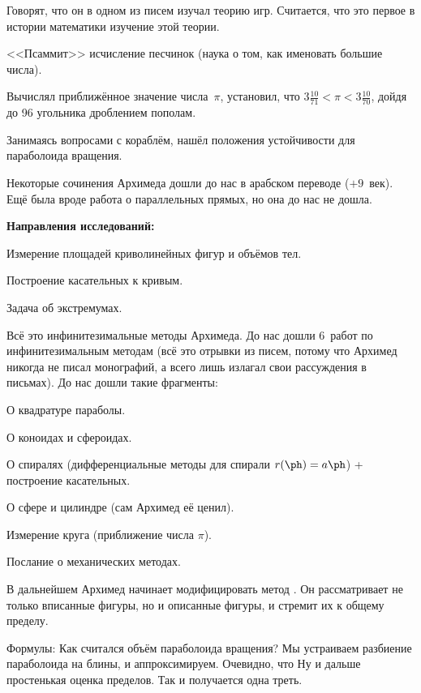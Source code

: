 \documentclass[a4paper,oneside,fleqn,10pt]{article}
\begin{document}
Говорят, что он в одном из писем изучал теорию игр. Считается, что это
первое в истории математики изучение этой теории.

<<Псаммит>> исчисление песчинок (наука о том, как именовать большие
числа).

Вычислял приближённое значение числа~$\pi$, установил, что
$3\frac{10}{71} < \pi < 3\frac{10}{70}$, дойдя до 96 угольника
дроблением пополам.

Занимаясь вопросами с кораблём, нашёл положения устойчивости для
параболоида вращения.

Некоторые сочинения Архимеда дошли до нас в арабском переводе
 ($+9$~век).  Ещё была вроде
работа о параллельных прямых, но она до нас не дошла.

\textbf{Направления исследований:}

\begin{items}{-2}
\item Измерение площадей криволинейных фигур и объёмов тел.
\item Построение касательных к кривым.
\item Задача об экстремумах.
\end{items}

Всё это инфинитезимальные методы Архимеда. До нас дошли 6~работ по
инфинитезимальным методам (всё это отрывки из писем, потому что
Архимед никогда не писал монографий, а всего лишь излагал свои
рассуждения в письмах). До нас дошли такие фрагменты:

\begin{nums}{-2}
\item О квадратуре параболы.
\item О коноидах и сфероидах.
\item О спиралях (дифференциальные методы для спирали $r(\ph) = a\ph$)
  + построение касательных.
\item О сфере и цилиндре (сам Архимед её ценил).
\item Измерение круга (приближение числа $\pi$).
\item Послание  о механических методах.
\end{nums}

В дальнейшем Архимед начинает модифицировать метод
.  Он рассматривает не только вписанные фигуры,
но и описанные фигуры, и стремит их к общему пределу.

Формулы: 
Как считался объём параболоида вращения?  Мы устраиваем разбиение
параболоида на блины, и аппроксимируем.  Очевидно, что
  Ну и дальше простенькая оценка
пределов. Так и получается одна треть.
\end{document}
